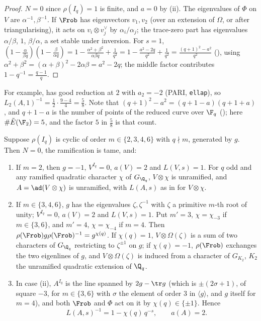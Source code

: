 \begin{proof}
$N=0$ since $\rho(I_q)=1$ is finite, and $a=0$ by (ii). The eigenvalues of $\Phi$ on $V$ are $\alpha^{-1},\beta^{-1}$. If $\Frob$ has eigenvectors
$v_1,v_2$ (over an extension of $\Omega$, or after triangularising), it acts on $v_i\otimes v_j^\vee$ by $\alpha_i/\alpha_j$; the trace-zero part has eigenvalues $\alpha/\beta$,
$1$, $\beta/\alpha$, a set stable under inversion. For $s=1$, $(1-\frac\alpha{\beta q})(1-\frac\beta{\alpha q})=1-\frac{\alpha^2+\beta^2}{\alpha\beta q}+\frac1{q^2}=1-\frac{a^2-2q}{q^2}+\frac1{q^2}=\frac{(q+1)^2-a^2}{q^2}$
(), using $\alpha^2+\beta^2=(\alpha+\beta)^2-2\alpha\beta=a^2-2q$; the middle factor contributes $1-q^{-1}=\frac{q-1}q$.
\end{proof}

For example,  has good reduction at $2$ with $a_2=-2$ (PARI, \texttt{ellap}), so $L_2(A,1)^{-1}=\frac12\cdot\frac{9-4}4=\frac58$. Note that
$(q+1)^2-a^2=(q+1-a)(q+1+a)$, and $q+1-a$ is the number of points of the reduced curve over $\F_q$ (); here
$\#\tilde E(\F_2)=5$, and the factor $5$ in $\frac58$ is that count.

\begin{proposition}\label{prop:local:tame-cyclic-shape}
Suppose $\rho(I_q)$ is cyclic of order $m\in\{2,3,4,6\}$ with $q\nmid m$, generated by $g$. Then $N=0$, the ramification is tame, and:
\begin{enumerate}[label=(\roman*)]
\item If $m=2$, then $g=-1$, $V^{I_q}=0$, $a(V)=2$ and $L(V,s)=1$. For $q$ odd and any ramified quadratic character $\chi$ of $G_{\Q_q}$, $V\otimes\chi$ is unramified, and
$A=\ad(V\otimes\chi)$ is unramified, with $L(A,s)$ as in  for $V\otimes\chi$.
\item If $m\in\{3,4,6\}$, $g$ has the eigenvalues $\zeta,\zeta^{-1}$ with $\zeta$ a primitive $m$-th root of unity; $V^{I_q}=0$, $a(V)=2$ and $L(V,s)=1$. Put $m'=3$, $\chi=\chi_{-3}$ if
$m\in\{3,6\}$, and $m'=4$, $\chi=\chi_{-4}$ if $m=4$. Then $\rho(\Frob)g\rho(\Frob)^{-1}=g^{\chi(q)}$. If $\chi(q)=1$, $V\otimes\Omega(\zeta)$ is a sum of two characters of $G_{\Q_q}$
restricting to $\zeta^{\pm1}$ on $g$; if $\chi(q)=-1$, $\rho(\Frob)$ exchanges the two eigenlines of $g$, and $V\otimes\Omega(\zeta)$ is induced from a character of
$G_{K_2}$, $K_2$ the unramified quadratic extension of $\Q_q$.
\item In case (ii), $A^{I_q}$ is the line spanned by $2g-\tr g$ (which is $\pm(2\sigma+1)$, of square $-3$, for $m\in\{3,6\}$ with $\sigma$ the element of order $3$ in
$\langle g\rangle$, and $g$ itself for $m=4$), and both $\Frob$ and $\Phi$ act on it by $\chi(q)\in\{\pm1\}$. Hence
\[
L(A,s)^{-1}=1-\chi(q)\,q^{-s},\qquad a(A)=2 .
\]
\end{enumerate}
\end{proposition}

